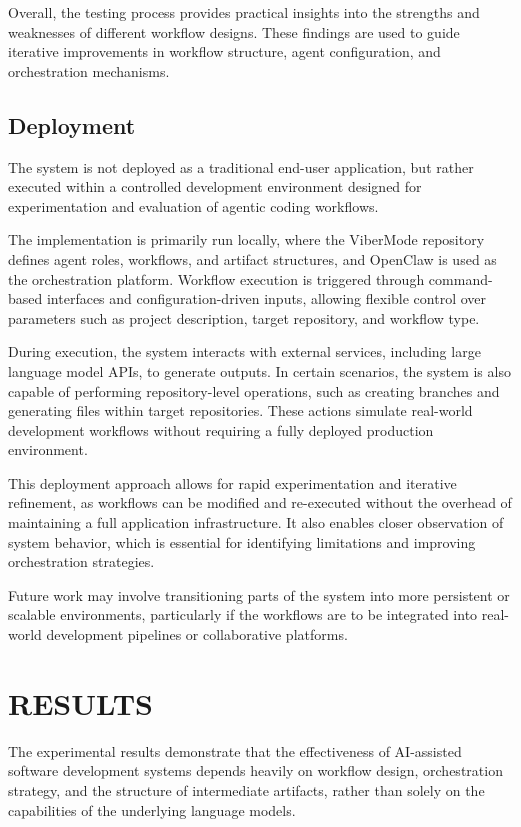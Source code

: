 \documentclass[a4paper,12pt]{report}
\begin{document}
Overall, the testing process provides practical insights into the strengths and weaknesses of different workflow designs. These findings are used to guide iterative improvements in workflow structure, agent configuration, and orchestration mechanisms.
\section{Deployment}
The system is not deployed as a traditional end-user application, but rather executed within a controlled development environment designed for experimentation and evaluation of agentic coding workflows.

The implementation is primarily run locally, where the ViberMode repository defines agent roles, workflows, and artifact structures, and OpenClaw is used as the orchestration platform. Workflow execution is triggered through command-based interfaces and configuration-driven inputs, allowing flexible control over parameters such as project description, target repository, and workflow type.

During execution, the system interacts with external services, including large language model APIs, to generate outputs. In certain scenarios, the system is also capable of performing repository-level operations, such as creating branches and generating files within target repositories. These actions simulate real-world development workflows without requiring a fully deployed production environment.

This deployment approach allows for rapid experimentation and iterative refinement, as workflows can be modified and re-executed without the overhead of maintaining a full application infrastructure. It also enables closer observation of system behavior, which is essential for identifying limitations and improving orchestration strategies.

Future work may involve transitioning parts of the system into more persistent or scalable environments, particularly if the workflows are to be integrated into real-world development pipelines or collaborative platforms.

\chapter{RESULTS}
The experimental results demonstrate that the effectiveness of AI-assisted software development systems depends heavily on workflow design, orchestration strategy, and the structure of intermediate artifacts, rather than solely on the capabilities of the underlying language models.
\end{document}
